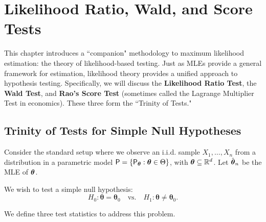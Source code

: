\chapter{Likelihood Ratio, Wald, and Score Tests}
\label{ch:Likelihood-Ratio-Wald-and-Score-Tests}

This chapter introduces a ``companion" methodology to maximum likelihood estimation: the theory of likelihood-based testing. Just as MLEs provide a general framework for estimation, likelihood theory provides a unified approach to hypothesis testing. Specifically, we will discuss the \textbf{Likelihood Ratio Test}, the \textbf{Wald Test}, and \textbf{Rao's Score Test} (sometimes called the Lagrange Multiplier Test in economics). These three form the ``Trinity of Tests."

\section{Trinity of Tests for Simple Null Hypotheses}
\label{sec:Trinity-of-Tests}

Consider the standard setup where we observe an i.i.d. sample $X_1, \dots, X_n$ from a distribution in a parametric model $\mathsf{P} = \{ \mathsf{P}_{\boldsymbol{\theta}} : \boldsymbol{\theta} \in \Theta \}$, with $\boldsymbol{\theta} \subseteq \mathbb{R}^d$. Let $\hat{\boldsymbol{\theta}}_n$ be the MLE of $\boldsymbol{\theta}$.

We wish to test a simple null hypothesis:
\[ H_0: \boldsymbol{\theta} = \boldsymbol{\theta}_0 \quad \text{vs.} \quad H_1: \boldsymbol{\theta} \neq \boldsymbol{\theta}_0. \]

We define three test statistics to address this problem.

